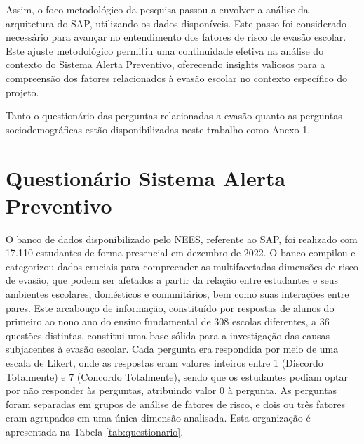 Assim, o foco metodológico da pesquisa passou a envolver a análise da arquitetura do SAP, utilizando os dados disponíveis. Este passo foi considerado necessário para avançar no entendimento dos fatores de risco de evasão escolar. Este ajuste metodológico permitiu uma continuidade efetiva na análise do contexto do Sistema Alerta Preventivo, oferecendo insights valiosos para a compreensão dos fatores relacionados à evasão escolar no contexto específico do projeto.

Tanto o questionário das perguntas relacionadas a evasão quanto as perguntas sociodemográficas estão disponibilizadas neste trabalho como Anexo 1.


\section{Questionário Sistema Alerta Preventivo}
\label{cap:analises-sap}


O banco de dados disponibilizado pelo NEES, referente ao SAP, foi realizado com 17.110 estudantes de forma presencial em dezembro de 2022. O banco compilou e categorizou dados cruciais para compreender as multifacetadas dimensões de risco de evasão, que podem ser afetados a partir da relação entre estudantes e seus ambientes escolares, domésticos e comunitários, bem como suas interações entre pares. Este arcabouço de informação, constituído por respostas de alunos do primeiro ao nono ano do ensino fundamental de 308 escolas diferentes, a 36 questões distintas, constitui uma base sólida para a investigação das causas subjacentes à evasão escolar. Cada pergunta era respondida por meio de uma escala de Likert, onde as respostas eram valores inteiros entre 1 (Discordo Totalmente) e 7 (Concordo Totalmente), sendo que os estudantes podiam optar por não responder às perguntas, atribuindo valor 0 à pergunta. As perguntas foram separadas em grupos de análise de fatores de risco, e dois ou três fatores eram agrupados em uma única dimensão analisada. Esta organização é apresentada na Tabela \ref{tab:questionario}.

